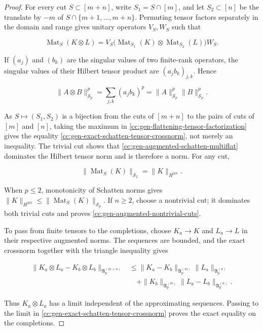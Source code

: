 \documentclass[10pt,reqno]{amsart}
\theoremstyle{plain}
\theoremstyle{definition}
\theoremstyle{remark}
\begin{document}
\begin{proof}
For every cut \(S\subset[m+n]\), write
\(S_1=S\cap[m]\), and let \(S_2\subset[n]\) be the translate by \(-m\)
of \(S\cap\{m+1,\ldots,m+n\}\).  Permuting tensor factors separately in
the domain and range gives unitary operators \(V_S,W_S\) such that

\begin{equation}
 \operatorname{Mat}_S(K\otimes L)
 =V_S\bigl(
   \operatorname{Mat}_{S_1}(K)\otimes
   \operatorname{Mat}_{S_2}(L)
  \bigr)W_S.
 \label{cc:gen-flattening-tensor-factorization}
\end{equation}

If \((a_j)\) and \((b_k)\) are the singular values of two finite-rank
operators, the singular values of their Hilbert tensor product are
\((a_jb_k)_{j,k}\).  Hence

\[
 \|A\otimes B\|_{\mathcal S_p}^p
 =\sum_{j,k}(a_jb_k)^p
 =\|A\|_{\mathcal S_p}^p\|B\|_{\mathcal S_p}^p.
\]

As \(S\mapsto(S_1,S_2)\) is a bijection from the cuts of \([m+n]\) to
the pairs of cuts of \([m]\) and \([n]\), taking the maximum in
\eqref{cc:gen-flattening-tensor-factorization} gives the equality
\eqref{cc:gen-exact-schatten-tensor-crossnorm}, not merely an inequality.
The trivial cut shows that \eqref{cc:gen-augmented-schatten-multiflat}
dominates the Hilbert tensor norm and is therefore a norm.  For any cut,

\[
 \|\operatorname{Mat}_S(K)\|_{\mathcal S_2}
 =\|K\|_{H^{\otimes n}}.
\]

When \(p\leq2\), monotonicity of Schatten norms gives
\(\|K\|_{H^{\otimes n}}\leq
\|\operatorname{Mat}_S(K)\|_{\mathcal S_p}\).  If \(n\geq2\), choose a
nontrivial cut; it dominates both trivial cuts and proves
\eqref{cc:gen-augmented-nontrivial-cuts}.

To pass from finite tensors to the completions, choose
\(K_a\to K\) and \(L_a\to L\) in their respective augmented norms.
The sequences are bounded, and the exact crossnorm together with the
triangle inequality gives

\begin{align*}
 \|K_a\otimes L_a-K_b\otimes L_b\|_{\mathfrak A_p^{(m+n)}}
 &\leq
 \|K_a-K_b\|_{\mathfrak A_p^{(m)}}
 \|L_a\|_{\mathfrak A_p^{(n)}}\\
 &\quad+
 \|K_b\|_{\mathfrak A_p^{(m)}}
 \|L_a-L_b\|_{\mathfrak A_p^{(n)}}.
\end{align*}

Thus \(K_a\otimes L_a\) has a limit independent of the approximating
sequences.  Passing to the limit in
\eqref{cc:gen-exact-schatten-tensor-crossnorm} proves the exact equality on
the completions.


\end{proof}
\end{document}
